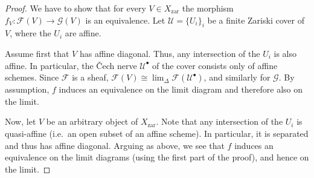 \documentclass[10pt,a4paper]{amsart}
\newcommand{\Cat}[1]{\mathcal{#1}}
\renewcommand{\lim}{\operatorname{lim}}
\newcommand{\zar}{\operatorname{zar}}
\begin{document}
\begin{proof}
    We have to show that for every $V \in X_{\zar}$ the morphism $f_V \colon \Cat F(V) \to \Cat G(V)$ 
    is an equivalence. Let $\Cat U = \{U_i\}_i$ be a finite Zariski cover of $V$, where the $U_i$ are affine.
    
    Assume first that $V$ has affine diagonal. Thus, any intersection of the $U_i$ 
    is also affine.
    In particular, the \v{C}ech nerve $\Cat U^\bullet$ of the cover consists only of affine schemes.
    Since $\Cat F$ is a sheaf, $\Cat F(V) \cong \lim_{\Delta} \Cat F(\Cat U^\bullet)$,
    and similarly for $\Cat G$.
    By assumption, $f$ induces an equivalence
    on the limit diagram and therefore also on the limit.

    Now, let $V$ be an arbitrary object of $X_{\zar}$. Note that any intersection of the $U_i$ 
    is quasi-affine (i.e.\ an open subset of an affine scheme). In particular, it is separated 
    and thus has affine diagonal. Arguing as above, we see that $f$ induces an equivalence 
    on the limit diagrams (using the first part of the proof), and hence on the limit.
\end{proof}
\end{document}
